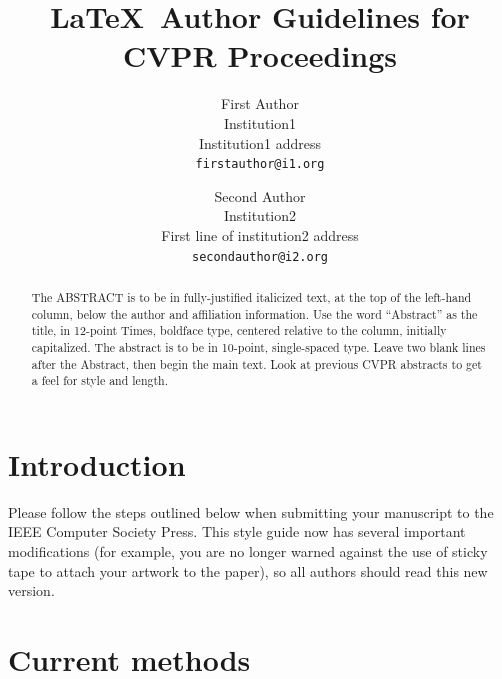\documentclass[10pt,twocolumn,letterpaper]{article}
\begin{document}
\title{\LaTeX\ Author Guidelines for CVPR Proceedings}

\author{First Author\\
Institution1\\
Institution1 address\\
{\tt\small firstauthor@i1.org}
\and
Second Author\\
Institution2\\
First line of institution2 address\\
{\tt\small secondauthor@i2.org}
}

\maketitle

\begin{abstract}
   The ABSTRACT is to be in fully-justified italicized text, at the top
   of the left-hand column, below the author and affiliation
   information. Use the word ``Abstract'' as the title, in 12-point
   Times, boldface type, centered relative to the column, initially
   capitalized. The abstract is to be in 10-point, single-spaced type.
   Leave two blank lines after the Abstract, then begin the main text.
   Look at previous CVPR abstracts to get a feel for style and length.
\end{abstract}

\section{Introduction}

Please follow the steps outlined below when submitting your manuscript to
the IEEE Computer Society Press.  This style guide now has several
important modifications (for example, you are no longer warned against the
use of sticky tape to attach your artwork to the paper), so all authors
should read this new version.

\section{Current methods}
\end{document}
